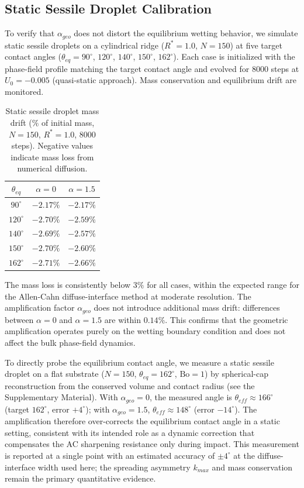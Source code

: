 \subsection{Static Sessile Droplet Calibration}\label{subsec:static}

To verify that $\alpha_{geo}$ does not distort the equilibrium wetting behavior, we simulate static sessile droplets on a cylindrical ridge ($R^*=1.0$, $N=150$) at five target contact angles ($\theta_{eq}=90^\circ$, $120^\circ$, $140^\circ$, $150^\circ$, $162^\circ$). Each case is initialized with the phase-field profile matching the target contact angle and evolved for 8000 steps at $U_0=-0.005$ (quasi-static approach). Mass conservation and equilibrium drift are monitored.

\begin{table}[htbp]
\centering
\caption{Static sessile droplet mass drift ($\%$ of initial mass, $N=150$, $R^*=1.0$, $8000$ steps). Negative values indicate mass loss from numerical diffusion.}
\label{tab:static}
\begin{tabular}{c|c|c}
\hline
$\theta_{eq}$ & $\alpha=0$ & $\alpha=1.5$ \\
\hline
$90^\circ$  & $-2.17\%$ & $-2.17\%$ \\
$120^\circ$ & $-2.70\%$ & $-2.59\%$ \\
$140^\circ$ & $-2.69\%$ & $-2.57\%$ \\
$150^\circ$ & $-2.70\%$ & $-2.60\%$ \\
$162^\circ$ & $-2.71\%$ & $-2.66\%$ \\
\hline
\end{tabular}
\end{table}

The mass loss is consistently below $3\%$ for all cases, within the expected range for the Allen-Cahn diffuse-interface method at moderate resolution. The amplification factor $\alpha_{geo}$ does not introduce additional mass drift: differences between $\alpha=0$ and $\alpha=1.5$ are within $0.14\%$. This confirms that the geometric amplification operates purely on the wetting boundary condition and does not affect the bulk phase-field dynamics.

To directly probe the equilibrium contact angle, we measure a static sessile droplet on a flat substrate ($N=150$, $\theta_{eq}=162^\circ$, $\mathrm{Bo}=1$) by spherical-cap reconstruction from the conserved volume and contact radius (see the Supplementary Material). With $\alpha_{geo}=0$, the measured angle is $\theta_{eff} \approx 166^\circ$ (target $162^\circ$, error $+4^\circ$); with $\alpha_{geo}=1.5$, $\theta_{eff} \approx 148^\circ$ (error $-14^\circ$). The amplification therefore over-corrects the equilibrium contact angle in a static setting, consistent with its intended role as a dynamic correction that compensates the AC sharpening resistance only during impact. This measurement is reported at a single point with an estimated accuracy of $\pm 4^\circ$ at the diffuse-interface width used here; the spreading asymmetry $k_{max}$ and mass conservation remain the primary quantitative evidence.

